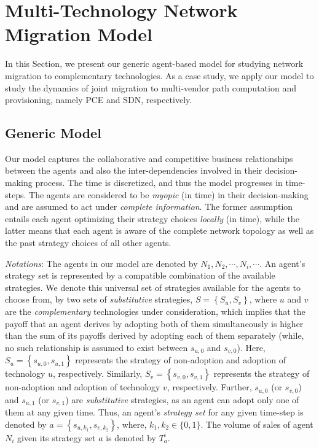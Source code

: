 \documentclass[smallextended]{svjour3}
\begin{document}
\section {Multi-Technology Network Migration Model} \label{sec:model}

\par In this Section, we present our generic agent-based model for studying
network migration to complementary technologies. As a case study, we apply our
model to study the dynamics of joint migration to multi-vendor path computation
and provisioning, namely PCE and SDN, respectively.

\subsection{Generic Model}

\par Our model captures the collaborative and competitive business relationships
between the agents and also the inter-dependencies involved in their
decision-making process. The time is discretized, and thus the model progresses
in time-steps. The agents are considered to be \emph{myopic} (in time) in their
decision-making and are assumed to act under \emph{complete information}. The
former assumption entails each agent optimizing their strategy choices
\emph{locally} (in time), while the latter means that each agent is
aware of the complete network topology as well as the past strategy choices of
all other agents.

\par \emph{Notations}: The agents in our model are denoted by $N_1, N_2, \cdots, N_i,
\cdots$. An agent's strategy set is represented by a compatible combination of
the available strategies. We denote this universal set of strategies available
for the agents to choose from, by two sets of \emph{substitutive} strategies, $S
= \left\{ S_{u}, S_{v}\right\}$, where $u$ and $v$ are the \emph{complementary}
technologies under consideration, which implies that the payoff that an agent
derives by adopting both of them simultaneously is higher than the sum of its
payoffs derived by adopting each of them separately (while, no such
relationship is assumed to exist between $s_{u,0}$ and $s_{v,0}$). Here,
$S_{u}=\left\{s_{u,0},s_{u,1}\right\}$ represents the strategy of non-adoption
and adoption of technology $u$, respectively. Similarly,
$S_{v}=\left\{s_{v,0},s_{v,1}\right\}$ represents the strategy of non-adoption
and adoption of technology $v$, respectively. Further, $s_{u,0}$ (or $s_{v,0}$) and
$s_{u,1}$ (or $s_{v,1}$) are \emph{substitutive} strategies, as an agent can
adopt only one of them at any given time. Thus, an agent's \emph{strategy
set} for any given time-step is denoted by $a=\left\{s_{u,
k_1},s_{v,k_2}\right\}$, where, $k_1,k_2 \in \{0,1\}$. The volume of sales of
agent $N_i$ given its strategy set $a$ is denoted by $T_{a}^i$.
\end{document}

